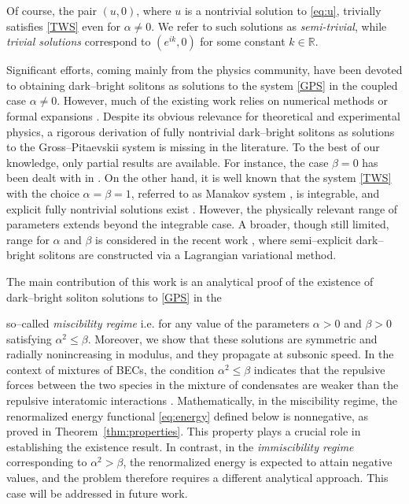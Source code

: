 \documentclass[11pt]{article}
\theoremstyle{plain}
\theoremstyle{definition}
\theoremstyle{remark}
\numberwithin{equation}{section}
\begin{document}
{Of course, the pair $(u,0)$, where $u$ is a nontrivial solution to \eqref{eq:u}, trivially satisfies \eqref{TWS} even for $\alpha\not=0$. We refer to such solutions as \emph{semi-trivial}, while \emph{trivial solutions} correspond to $(e^{ik},0)$ for some constant $k\in\mathbb{R}$. 

Significant efforts, coming mainly from the physics community, have been devoted to obtaining dark--bright solitons as solutions to the system \eqref{GPS} in the coupled case $\alpha\not=0$. However, much of the existing work relies on numerical methods or formal expansions \cite{kivshar1998dark, kevrekidis_frantzeskakis_carretero-gonzalez_2008}. Despite its obvious relevance for theoretical and experimental physics, a rigorous derivation of fully nontrivial dark--bright solitons as solutions to the Gross--Pitaevskii system is missing in the literature. To the best of our knowledge, only partial results are available. For instance, the case $\beta=0$ has been dealt with in \cite{Maris2006,alhelou}. On the other hand, it is well known that the system \eqref{TWS} with the choice $\alpha = \beta = 1$, referred to as Manakov system \cite{Manakov}, is integrable, and explicit fully nontrivial solutions exist \cite{Busch_Anglin,Sheppard_Kivshar}. However, the physically relevant range of parameters extends beyond the integrable case. A broader, though still limited, range for $\alpha$ and $\beta$ is considered in the recent work \cite{Mao_Zhao}, where semi--explicit dark--bright solitons are constructed via a Lagrangian variational method.

The main contribution of this work is an analytical proof of the existence of dark--bright soliton solutions to \eqref{GPS} in the {so--called \emph{miscibility regime} i.e. for any value of the parameters $\alpha>0$ and $\beta>0$ satisfying $\alpha^2\leq\beta$. Moreover, we show that these solutions are symmetric and radially nonincreasing in modulus, and they propagate at subsonic speed. In the context of mixtures of BECs, the condition $\alpha^2\leq\beta$ indicates that the repulsive forces between the two species in the mixture of condensates are weaker than the repulsive interatomic interactions \cite{kevrekidis_frantzeskakis_carretero-gonzalez_2008,berloff2008}. Mathematically, in the miscibility regime, the renormalized energy functional \eqref{eq:energy} defined below is nonnegative, as proved in Theorem~\ref{thm:properties}. This property plays a crucial role in establishing the existence result. In contrast, in the \emph{immiscibility regime} corresponding to $\alpha^2 > \beta$, the renormalized energy is expected to attain negative values, and the problem therefore requires a different analytical approach. This case will be addressed in  future work.

}}
\end{document}
